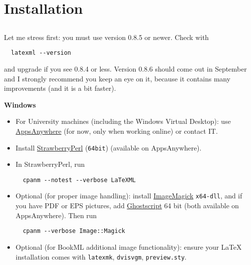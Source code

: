 \documentclass[a4paper]{article}
\theoremstyle{definition}
\begin{document}
\tableofcontents

\section{Installation}

\subsection{\texorpdfstring{\LaTeXML{}}{LaTeXML}}
Let me stress first: you must use \LaTeXML{} version 0.8.5 or newer. Check with
\begin{lstlisting}
  latexml --version
\end{lstlisting}
and upgrade if you see 0.8.4 or less. Version 0.8.6 should come out in September and I strongly recommend you keep an eye on it, because it contains many improvements (and it is a bit faster).

\begin{h:details}
  \begin{h:summary}\textbf{Windows}\end{h:summary}
  \begin{itemize}
    \item For University machines (including the Windows Virtual Desktop): use \href{https://it.leeds.ac.uk/it?id=kb_article&sysparm_article=KB0014827}{AppsAnywhere} (for now, only when working online) or contact IT.
    \item Install \href{https://strawberryperl.com/}{StrawberryPerl} (\texttt{64bit}) (available on AppsAnywhere).
    \item In StrawberryPerl, run
      \begin{lstlisting}
  cpanm --notest --verbose LaTeXML
      \end{lstlisting}
    \item Optional (for proper image handling): install \href{https://imagemagick.org/script/download.php}{ImageMagick} \texttt{x64-dll}, and if you have PDF or EPS pictures, add \href{https://www.ghostscript.com/download/gsdnld.html}{Ghostscript} 64 bit (both available on AppsAnywhere). Then run
      \begin{lstlisting}
  cpanm --verbose Image::Magick
      \end{lstlisting}
    \item Optional (for BookML additional image functionality): ensure your \LaTeX{} installation comes with \texttt{latexmk}, \texttt{dvisvgm}, \texttt{preview.sty}.
  \end{itemize}
\end{h:details}
\end{document}
